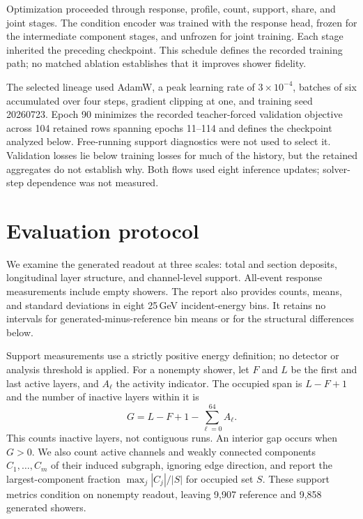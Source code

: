 \documentclass[11pt]{article}
\begin{document}
Optimization proceeded through response, profile, count, support, share, and joint stages. The condition encoder was trained with the response head, frozen for the intermediate component stages, and unfrozen for joint training. Each stage inherited the preceding checkpoint. This schedule defines the recorded training path; no matched ablation establishes that it improves shower fidelity.

The selected lineage used AdamW, a peak learning rate of $3\times10^{-4}$, batches of six accumulated over four steps, gradient clipping at one, and training seed 20260723. Epoch 90 minimizes the recorded teacher-forced validation objective across 104 retained rows spanning epochs 11--114 and defines the checkpoint analyzed below. Free-running support diagnostics were not used to select it. Validation losses lie below training losses for much of the history, but the retained aggregates do not establish why. Both flows used eight inference updates; solver-step dependence was not measured.

\section{Evaluation protocol}
\label{sec:diagnostics}

We examine the generated readout at three scales: total and section deposits, longitudinal layer structure, and channel-level support. All-event response measurements include empty showers. The report also provides counts, means, and standard deviations in eight 25\,GeV incident-energy bins. It retains no intervals for generated-minus-reference bin means or for the structural differences below.

Support measurements use a strictly positive energy definition; no detector or analysis threshold is applied. For a nonempty shower, let $F$ and $L$ be the first and last active layers, and $A_\ell$ the activity indicator. The occupied span is $L-F+1$ and the number of inactive layers within it is
\begin{equation}
 G=L-F+1-\sum_{\ell=0}^{64}A_\ell.
 \label{eq:gaps}
\end{equation}
This counts inactive layers, not contiguous runs. An interior gap occurs when $G>0$. We also count active channels and weakly connected components $C_1,\ldots,C_m$ of their induced subgraph, ignoring edge direction, and report the largest-component fraction $\max_j|C_j|/|S|$ for occupied set $S$. These support metrics condition on nonempty readout, leaving 9,907 reference and 9,858 generated showers.
\end{document}

